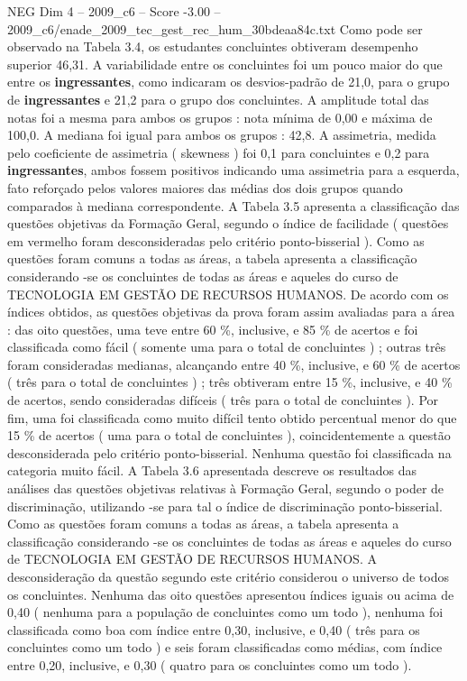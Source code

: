 \begin{textsample}{NEG Dim 4 – 2009\_c6 – Score -3.00 – 2009\_c6/enade\_2009\_tec\_gest\_rec\_hum\_30bdeaa84c.txt}
Como pode ser observado na Tabela 3.4, os estudantes concluintes obtiveram desempenho superior 46,31.
A variabilidade entre os concluintes foi um pouco maior do que entre os \textbf{ingressantes}, como indicaram os desvios-padrão de 21,0, para o grupo de \textbf{ingressantes} e 21,2 para o grupo dos concluintes.
A amplitude total das notas foi a mesma para ambos os grupos : nota mínima de 0,00 e máxima de 100,0.
A mediana foi igual para ambos os grupos : 42,8.
A assimetria, medida pelo coeficiente de assimetria ( skewness ) foi 0,1 para concluintes e 0,2 para \textbf{ingressantes}, ambos fossem positivos indicando uma assimetria para a esquerda, fato reforçado pelos valores maiores das médias dos dois grupos quando comparados à mediana correspondente.
A Tabela 3.5 apresenta a classificação das questões objetivas da Formação Geral, segundo o índice de facilidade ( questões em vermelho foram desconsideradas pelo critério ponto-bisserial ).
Como as questões foram comuns a todas as áreas, a tabela apresenta a classificação considerando -se os concluintes de todas as áreas e aqueles do curso de TECNOLOGIA EM GESTÃO DE RECURSOS HUMANOS.
De acordo com os índices obtidos, as questões objetivas da prova foram assim avaliadas para a área : das oito questões, uma teve entre 60 \%, inclusive, e 85 \% de acertos e foi classificada como fácil ( somente uma para o total de concluintes ) ; outras três foram consideradas medianas, alcançando entre 40 \%, inclusive, e 60 \% de acertos ( três para o total de concluintes ) ; três obtiveram entre 15 \%, inclusive, e 40 \% de acertos, sendo consideradas difíceis ( três para o total de concluintes ).
Por fim, uma foi classificada como muito difícil tento obtido percentual menor do que 15 \% de acertos ( uma para o total de concluintes ), coincidentemente a questão desconsiderada pelo critério ponto-bisserial.
Nenhuma questão foi classificada na categoria muito fácil.
A Tabela 3.6 apresentada descreve os resultados das análises das questões objetivas relativas à Formação Geral, segundo o poder de discriminação, utilizando -se para tal o índice de discriminação ponto-bisserial.
Como as questões foram comuns a todas as áreas, a tabela apresenta a classificação considerando -se os concluintes de todas as áreas e aqueles do curso de TECNOLOGIA EM GESTÃO DE RECURSOS HUMANOS.
A desconsideração da questão segundo este critério considerou o universo de todos os concluintes.
Nenhuma das oito questões apresentou índices iguais ou acima de 0,40 ( nenhuma para a população de concluintes como um todo ), nenhuma foi classificada como boa com índice entre 0,30, inclusive, e 0,40 ( três para os concluintes como um todo ) e seis foram classificadas como médias, com índice entre 0,20, inclusive, e 0,30 ( quatro para os concluintes como um todo ).

\end{textsample}
